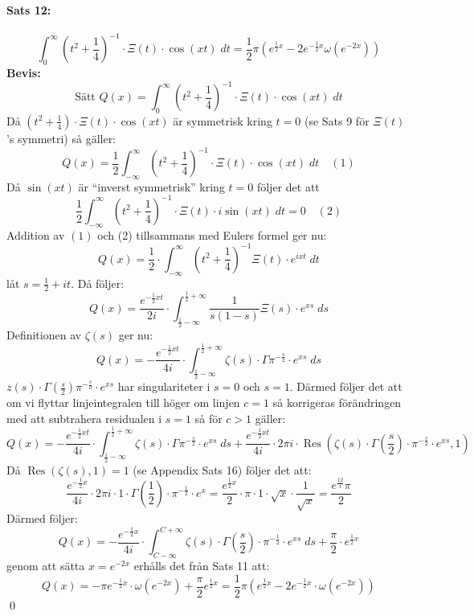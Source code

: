 \documentclass{article}%
\begin{document}
\paragraph{Sats 12:} 
\[
	\int_0^\infty (t^2 + \frac 1 4)^{-1} \cdot \Xi(t) \cdot \cos(xt) \; dt = \frac 1 2 \pi(e^{\tfrac 1 2 x} -
		2e^{-\tfrac 1 2 x} \omega(e^{- 2 x}))
\]
{\bf Bevis:}\\
\[
	\text{Sätt } Q(x) = \int_0^\infty (t^2 + \frac 1 4)^{-1} \cdot \Xi(t) \cdot \cos(xt) \; dt
\]
Då $(t^2 + \frac 1 4) \cdot \Xi(t) \cdot \cos(xt)$ är symmetrisk kring $t = 0$ (se Sats 9 för $\Xi(t)$'s symmetri)
så gäller:
\[
	Q(x) = \frac 1 2 \int_{-\infty}^\infty (t^2 + \frac 1 4)^{- 1} \cdot \Xi(t) \cdot \cos(xt) \; dt \quad (1)
\]
Då $\sin(xt)$ är ``inverst symmetrisk'' kring $t = 0$ följer det att 
\[
	\frac 1 2 \int_{-\infty}^\infty (t^2 + \frac 1 4)^{- 1} \cdot \Xi(t) \cdot i\sin(xt) \; dt = 0 \quad (2)
\]
Addition av $(1)$ och (2) tillsammans med Eulers formel ger nu: 
\[
	Q(x) = \frac 1 2 \cdot \int_{- \infty}^\infty (t^2 + \frac 1 4)^{-1} \Xi(t)\cdot e^{ixt} \; dt
\]
låt $s = \frac 1 2 + it$. Då följer:
\[
	Q(x) = \frac 
	{
		e^{- \tfrac 1 2 x t}
	}
	{
		2i
	}
	\cdot \int_{\tfrac 1 2 - \infty}^{\tfrac 1 2 + \infty} \frac {1} {s(1-s)} \Xi(s) \cdot e^{xs} \; ds
\]
Definitionen av $\zeta(s)$ ger nu:
\[
	Q(x) = - \frac {e^{- \frac 1 2 xt}} {4i} \cdot \int_{\tfrac 1 2 - \infty}^{\tfrac 1 2 + \infty} \zeta(s) \cdot \Gamma
		\pi^{- \frac s 2} \cdot e^{xs} \; ds
\]
$z(s) \cdot \Gamma(\frac s 2) \pi^{- \frac s 0} \cdot e^{xs}$ har singulariteter i $s = 0$ och $s = 1$.
Därmed följer det att om vi flyttar linjeintegralen till höger om linjen $c=1$ så korrigeras förändringen med att 
subtrahera residualen i $s = 1$ så för $c > 1$ gäller:
\[
	Q(x) = - \frac {e^{- \frac 1 2 xt}} {4i} \cdot \int_{\tfrac 1 2 - \infty}^{\tfrac 1 2 + \infty} \zeta(s) \cdot \Gamma
		\pi^{- \frac s 2} \cdot e^{xs} \; ds + \frac {e^{- \frac 1 2 xt}} {4i} \cdot2 \pi i \cdot \operatorname{Res}(\zeta(s) \cdot
		\Gamma(\frac s 2) \cdot \pi^{-\frac s 2} \cdot e^{xs}, 1)
\]
Då $\operatorname{Res}(\zeta(s), 1) = 1$ (se Appendix Sats 16) följer det att:
\[
	\frac {e^{- \frac 1 2 x}} {4i} \cdot 2 \pi i \cdot 1 \cdot \Gamma(\frac 1 2) \cdot \pi^{- \frac 1 2} \cdot e^x =
		\frac {e^{\frac 1 2 x}} {2} \cdot \pi \cdot 1 \cdot \sqrt{x} \cdot \frac {1} {\sqrt{x}} = \frac {e^{\frac {1 2} x} \pi} {2}
\]
Därmed följer:
\[
	Q(x) = - \frac {e^{-\frac 1 2 x}} {4 i} \cdot \int_{C - \infty}^{C + \infty} \zeta(s) \cdot \Gamma(\frac s 2)
		\cdot \pi^{- \frac 1 2} \cdot e^{xs} \; ds + \frac \pi 2 \cdot e^{\frac 1 2 x}
\]
genom att sätta $x = e^{-2x}$ erhålls det från Sats 11 att:
\[
	Q(x) = - \pi e^{- \frac 1 2 x} \cdot \omega(e^{- 2 x}) + \frac \pi 2 e^{\frac 1 2 x} = \frac 1 2 \pi
		(e^{\frac 1 2 x} - 2 e^{- \frac 1 2 x} \cdot \omega(e^{-2x}))
\]
\hfill \qed
\end{document}
